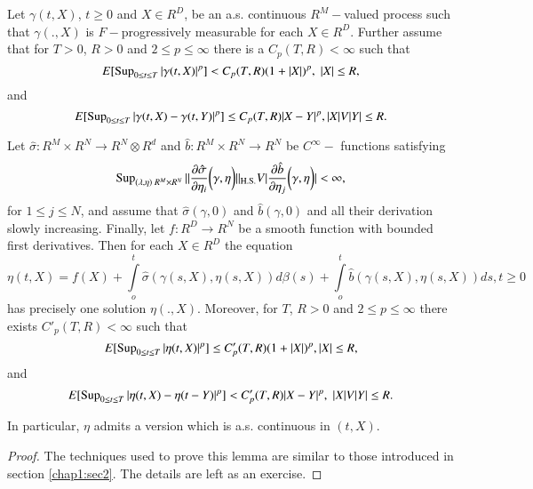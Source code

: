 \setcounter{lemma}{0}
\begin{lemma}\label{chap1:lem3.1} %
Let $\gamma(t,X)$, $t \ge 0$ and $X \in R^D$, be an a.s. continuous
$R^M-$valued process such that $\gamma(.,X)$ is $F-$progressively
measurable for each $X \in R^D$. Further assume that for $T>0$, $R>0$ and
$2 \le p \le \infty$ there is a $C_p (T,R)< \infty$ such that 
$$
E [ \operatorname{Sup}_{0 \le t \le T} |\gamma(t,X)|^p]< C_p (T,R)(1+|X|)^p, \; |X| \le
R, 
$$
and
$$
E [ \operatorname{Sup}_{0 \le t \le T} |\gamma(t,X)-\gamma(t,Y)|^p] \le C_p
(T,R)|X-Y|^p, |X|V|Y| \le R. 
$$

Let $\hat{\sigma}:R^M\times R^N \to R^N \otimes R^d$ and
$\hat{b}:R^M\times R^N \to R^N$ be $C^\infty-$ functions satisfying 
$$ 
\operatorname{Sup} _{(\lambda , \eta) \; R^M \times R^N} ||\frac{\partial
  \hat{\sigma}}{\partial \eta_i} \bigg ( \gamma, \eta \bigg )
||_{\rm H.S.} V|\frac{\partial \hat {b}} {\partial \eta_j}\bigg ( \gamma,
\eta \bigg )| < \infty , 
$$
for $1 \le j \le N$, and assume that $\hat{\sigma}(\gamma ,0)$ and
$\hat{b}(\gamma ,0)$ and all their derivation slowly
increasing. Finally, let $f:R^D \to R^N$ be a smooth function with
bounded first derivatives. Then for each $X \in R^D$ the equation 
{\fontsize{10pt}{12pt}\selectfont
$$
\eta(t,X)=f(X)+ \int\limits^t_o \hat{\sigma}(\gamma(s,X),\eta
(s,X))d \beta (s) + \int\limits^t_o \hat{b}(\gamma(s,X), \eta (s,X))ds,
t \ge 0  
$$}\relax
has precisely one solution $\eta (.,X)$. Moreover, for $T$, $R>0$ and $2
\le p \le \infty$ there exists $C'_p (T,R)< \infty$ such that 
$$
E[\operatorname{Sup}_{0 \le t \le T}|\eta (t,X)|^p] \le C_p'(T,R)(1+ |X|)^p, |X|
\le R, 
$$
and 
$$
E[\operatorname{Sup}_{0 \le t \le T} |\eta (t,X) - \eta (t-Y)|^p]<
C'_p(T,R)|X-Y|^p, \; |X|V|Y| \le R. 
$$\pageoriginale

In particular, $\eta$ admits a version which is a.s. continuous in
$(t,X)$.  
\end{lemma}

\begin{proof}
The techniques used to prove this lemma are similar to those
introduced in section \ref{chap1:sec2}. The details are left as an
exercise.  
\end{proof}

